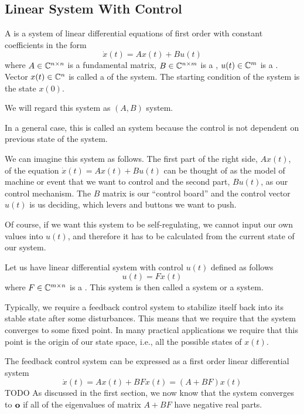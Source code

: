 \subsection{Linear System With Control}

\begin{definition}
	A  is a system of linear differential equations of first order with constant coefficients in the form $$\dot{x}(t)=Ax(t)+Bu(t)$$ where $A\in\mathbb{C}^{n\times n}$ is a fundamental matrix, $B\in\mathbb{C}^{n\times m}$ is a , $u(t)\in\mathbb{C}^m$ is a . Vector $x(t)\in\mathbb{C}^n$ is called a  of the system. The starting condition of the system is the state $x(0)$.

	We will regard this system as $(A,B)$ system.
\end{definition}

In a general case, this is called an  system because the control is not dependent on previous state of the system.

We can imagine this system as follows. The first part of the right side, $Ax(t)$, of the equation $\dot{x}(t)=Ax(t)+Bu(t)$ can be thought of as the model of machine or event that we want to control and the second part, $Bu(t)$, as our control mechanism. The $B$ matrix is our ``control board'' and the control vector $u(t)$ is us deciding, which levers and buttons we want to push. 

Of course, if we want this system to be self-regulating, we cannot input our own values into $u(t)$, and therefore it has to be calculated from the current state of our system.

\begin{definition}
	Let us have linear differential system with control $u(t)$ defined as follows $$u(t)=Fx(t)$$ where $F\in\mathbb{C}^{m\times n}$ is a . This system is then called a  system or a  system.
\end{definition}

Typically, we require a feedback control system to stabilize itself back into its stable state after some disturbances. This means that we require that the system converges to some fixed point. In many practical applications we require that this point is the origin of our state space, i.e., all the possible states of $x(t)$.

The feedback control system can be expressed as a first order linear differential system $$\dot{x}(t)=Ax(t)+BFx(t)=(A+BF)x(t)$$ TODO As discussed in the first section, we now know that the system converges to $\textbf{o}$ if all of the eigenvalues of matrix $A+BF$ have negative real parts. 

